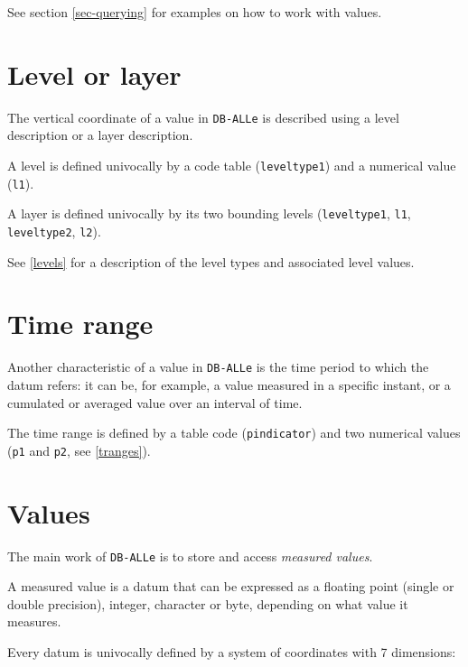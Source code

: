 \documentclass[final,12pt,a4paper,twoside]{book}
\newcommand{\dballe}{{\tt DB-ALLe}}
\begin{document}
See section \ref{sec-querying} for examples on how to work with values.

\section {Level or layer}

The vertical coordinate of a value in \dballe{} is described using a level
description or a layer description.

A level is defined univocally by a code table (\texttt{leveltype1}) and a
numerical value (\texttt{l1}).

A layer is defined univocally by its two bounding levels (\texttt{leveltype1},
\texttt{l1}, \texttt{leveltype2}, \texttt{l2}). 

See \ref{levels} for a description of the level types and associated level
values.


\section {Time range}

Another characteristic of a value in \dballe{} is the time period to which the
datum refers: it can be, for example, a value measured in a specific instant,
or a cumulated or averaged value over an interval of time.

The time range is defined by a table code (\texttt{pindicator}) and two
numerical values (\texttt{p1} and \texttt{p2}, see \ref{tranges}).

\section {Values}
\label{basics-values}

The main work of \dballe{} is to store and access \emph{measured values}.

A measured value is a datum that can be expressed as a floating point (single
or double precision), integer, character or byte, depending on what value it
measures.

Every datum is univocally defined by a system of coordinates with 7 dimensions:
\end{document}

